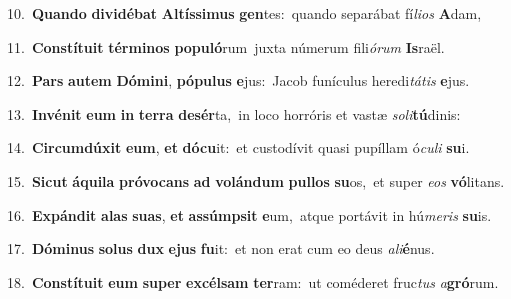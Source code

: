 {{\numbfont\textcolor{\numbcolor}{10.}}~\-\textbf{Quan}\-\textbf{do} \textbf{di}\-\textbf{vi}\textbf{dé}\textbf{bat} \textbf{Al}\-\textbf{tís}\textbf{si}\textbf{mus} \textbf{gen}\-tes:~\star quando separábat fí\-\textit{li}\-\textit{os} \textbf{A}\-dam,\par
{\numbfont\textcolor{\numbcolor}{11.}}~\-\textbf{Con}\-\textbf{stí}\textbf{tu}\textbf{it} \textbf{tér}\-\textbf{mi}\textbf{nos} \textbf{po}\-\textbf{pu}\textbf{ló}rum~\star juxta númerum fili\-\textit{ó}\-\textit{rum} \textbf{Is}\-raël.\par
{\numbfont\textcolor{\numbcolor}{12.}}~\textbf{Pars} \textbf{au}\-\textbf{tem} \textbf{Dó}\-\textbf{mi}\textbf{ni}, \textbf{pó}\-\textbf{pu}\textbf{lus} \textbf{e}\-jus:~\star Jacob funículus heredi\-\textit{tá}\-\textit{tis} \textbf{e}\-jus.\par
{\numbfont\textcolor{\numbcolor}{13.}}~\-\textbf{In}\-\textbf{vé}\textbf{nit} \textbf{e}\-\textbf{um} \textbf{in} \textbf{ter}\-\textbf{ra} \textbf{de}\-\textbf{sér}ta,~\star in loco horróris et vastæ \textit{so}\-\textit{li}\textbf{tú}dinis:\par
{\numbfont\textcolor{\numbcolor}{14.}}~\-\textbf{Cir}\-\textbf{cum}\textbf{dú}\textbf{xit} \textbf{e}\-\textbf{um}, \textbf{et} \textbf{dó}\-\textbf{cu}it:~\star et custodívit quasi pupíllam ó\-\textit{cu}\-\textit{li} \textbf{su}\-i.\par
{\numbfont\textcolor{\numbcolor}{15.}}~\-\textbf{Sic}\-\textbf{ut} \textbf{á}\-\textbf{qui}\textbf{la} \textbf{pró}\-\textbf{vo}\textbf{cans} \textbf{ad} \textbf{vo}\-\textbf{lán}\textbf{dum} \textbf{pul}\-\textbf{los} \textbf{su}\-os,~\star et super \textit{e}\-\textit{os} \textbf{vó}\-litans.\par
{\numbfont\textcolor{\numbcolor}{16.}}~\-\textbf{Ex}\-\textbf{pán}\textbf{dit} \textbf{a}\-\textbf{las} \textbf{su}\-\textbf{as}, \textbf{et} \textbf{as}\-\textbf{súmp}\textbf{sit} \textbf{e}\-um,~\star atque portávit in hú\-\textit{me}\-\textit{ris} \textbf{su}\-is.\par
{\numbfont\textcolor{\numbcolor}{17.}}~\-\textbf{Dó}\-\textbf{mi}\textbf{nus} \textbf{so}\-\textbf{lus} \textbf{dux} \textbf{e}\-\textbf{jus} \textbf{fu}\-it:~\star et non erat cum eo deus \textit{a}\-\textit{li}\textbf{é}nus.\par
{\numbfont\textcolor{\numbcolor}{18.}}~\-\textbf{Con}\-\textbf{stí}\textbf{tu}\textbf{it} \textbf{e}\-\textbf{um} \textbf{su}\-\textbf{per} \textbf{ex}\-\textbf{cél}\textbf{sam} \textbf{ter}\-ram:~\star ut coméderet fruc\textit{tus} \textit{a}\-\textbf{gró}rum.\par
}
